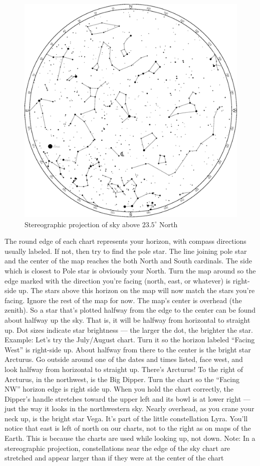 \documentclass[a4paper,12pt]{extarticle}
\begin{document}
\begin{figure}[H]
    \centering
    \includegraphics[width=0.9\linewidth]{stereo_1.eps}
    \caption{Stereographic projection of sky above $23.5^\circ$ North}
    \label{stereo_2}
\end{figure}

The round edge of each chart represents your horizon, with compass directions usually labeled. If not, then try to find the pole star. The line joining pole star and the center of the map reaches the both North and South cardinals. The side which is closest to Pole star is obviously your North. Turn the map around so the edge marked with the direction you’re facing (north, east, or whatever) is right-side up. The stars above this horizon on the map will now match the stars you’re facing. Ignore the rest of the map for now. The map’s center is overhead (the zenith). So a star that’s plotted halfway from the edge to the center can be found about halfway up the sky. That is, it will be halfway from horizontal to straight up. Dot sizes indicate star brightness — the larger the dot, the brighter the star. Example: Let’s try the July/August chart. Turn it so the horizon labeled “Facing West” is right-side up. About halfway from there to the center is the bright star Arcturus. Go outside around one of the dates and times listed, face west, and look halfway from horizontal to straight up. There’s Arcturus! To the right of Arcturus, in the northwest, is the Big Dipper. Turn the chart so the “Facing NW” horizon edge is right side up. When you hold the chart correctly, the Dipper’s handle stretches toward the upper left and its bowl is at lower right — just the way it looks in the northwestern sky. Nearly overhead, as you crane your neck up, is the bright star Vega. It’s part of the little constellation Lyra. You’ll notice that east is left of north on our charts, not to the right as on maps of the Earth. This is because the charts are used while looking up, not down. Note: In a stereographic projection, constellations near the edge of the sky chart are stretched and appear larger than if they were at the center of the chart\\
\end{document}
